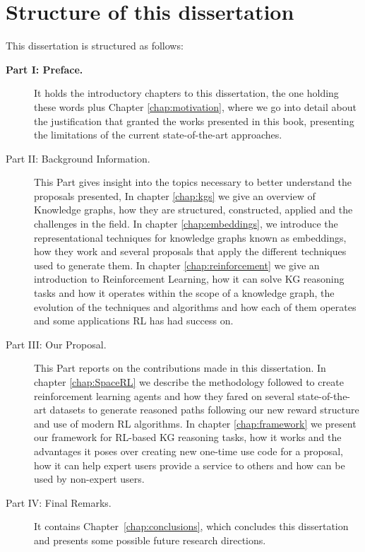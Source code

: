 \section{Structure of this dissertation}\label{sec:intro-structure}
This dissertation is structured as follows:

\begin{description}
    \item[\textbf{Part I: Preface.}] 
    It holds the introductory chapters to this dissertation, the one holding these words plus Chapter \ref{chap:motivation}, where we go into detail about the justification that granted the works presented in this book, presenting the limitations of the current state-of-the-art approaches.\\
    
    \item[Part II: Background Information.] 
    This Part gives insight into the topics necessary to better understand the proposals presented, In chapter \ref{chap:kgs} we give an overview of Knowledge graphs, how they are structured, constructed, applied and the challenges in the field. In chapter \ref{chap:embeddings}, we introduce the representational techniques for knowledge graphs known as embeddings, how they work and several proposals that apply the different techniques used to generate them. In chapter \ref{chap:reinforcement} we give an introduction to Reinforcement Learning, how it can solve KG reasoning tasks and how it operates within the scope of a knowledge graph, the evolution of the techniques and algorithms and how each of them operates and some applications RL has had success on.
    
    \item[Part III: Our Proposal.]
    This Part reports on the contributions made in this dissertation. In chapter \ref{chap:SpaceRL} we describe the methodology followed to create reinforcement learning agents and how they fared on several state-of-the-art datasets to generate reasoned paths following our new reward structure and use of modern RL algorithms. In chapter \ref{chap:framework} we present our framework for RL-based KG reasoning tasks, how it works and the advantages it poses over creating new one-time use code for a proposal, how it can help expert users provide a service to others and how can be used by non-expert users.
    
    \item[Part IV: Final Remarks.]
    It contains Chapter~\ref{chap:conclusions}, which concludes this dissertation and presents some possible future research directions.
\end{description}